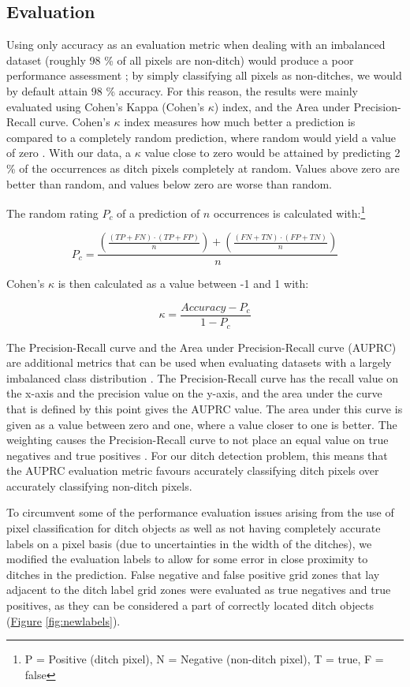 \documentclass[11pt, review]{elsarticle} %
\begin{document}
\subsection{Evaluation} \label{evaluation}

Using only accuracy as an evaluation metric when dealing with an imbalanced dataset (roughly 98 \% of all pixels are non-ditch) would produce a poor performance assessment \citep{balanced}; by simply classifying all pixels as non-ditches, we would by default attain 98 \% accuracy. For this reason, the results were mainly evaluated using Cohen's Kappa (Cohen's $\kappa$) index, and the Area under Precision-Recall curve. Cohen's $\kappa$ index measures how much better a prediction is compared to a completely random prediction, where random would yield a value of zero \citep{kappa123}. With our data, a $\kappa$ value close to zero would be attained by predicting 2 \% of the occurrences as ditch pixels completely at random. Values above zero are better than random, and values below zero are worse than random.

The random rating $P_c$ of a prediction of $n$ occurrences is calculated with:\footnote{ P = Positive (ditch pixel), N = Negative (non-ditch pixel), T = true, F = false}

$$
P_c = \frac{\left(\frac{(TP + FN) \cdot (TP + FP)}{n}\right) + \left(\frac{(FN + TN) \cdot (FP + TN)}{n}\right)}{n}
$$


Cohen's $\kappa$ is then calculated as a value between -1 and 1 with:

$$\kappa = \frac{Accuracy - P_c}{1 - P_c}$$

The Precision-Recall curve and the Area under Precision-Recall curve (AUPRC) are additional metrics that can be used when evaluating datasets with a largely imbalanced class distribution \citep{precision_recall_curve}. The Precision-Recall curve has the recall value on the x-axis and the precision value on the y-axis, and the area under the curve that is defined by this point gives the AUPRC value. The area under this curve is given as a value between zero and one, where a value closer to one is better. The weighting causes the Precision-Recall curve to not place an equal value on true negatives and true positives \citep{precision_recall_curve}. For our ditch detection problem, this means that the AUPRC evaluation metric favours accurately classifying ditch pixels over accurately classifying non-ditch pixels.

To circumvent some of the performance evaluation issues arising from the use of pixel classification for ditch objects as well as not having completely accurate labels on a pixel basis (due to uncertainties in the width of the ditches), we modified the evaluation labels to allow for some error in close proximity to ditches in the prediction. False negative and false positive grid zones that lay adjacent to the ditch label grid zones were evaluated as true negatives and true positives, as they can be considered a part of correctly located ditch objects (\hyperref[fig:newlabels]{Figure} \ref{fig:newlabels}).
\end{document}
